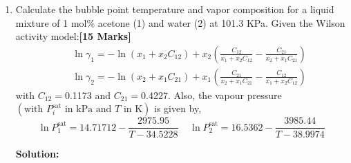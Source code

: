 \documentclass[12pts,a4paper,amsmath,amssymb,floatfix]{article}%
\newcommand{\frc}{\displaystyle\frac}
\begin{document}
\begin{enumerate}[label=\bfseries Problem \arabic*]
\item\label{Example:2} Calculate the bubble point temperature and vapor composition for a liquid mixture of 1 mol$\%$ acetone (1) and water (2) at 101.3 KPa. Given the Wilson activity model:\hfill{\bf [15 Marks]}
   \begin{eqnarray}
       &&\ln\gamma_{1} = -\ln\left(x_{1}+x_{2}C_{12}\right) + x_{2}\left(\frc{C_{12}}{x_{1}+x_{2}C_{12}}-\frc{C_{21}}{x_{2}+x_{1}C_{21}}\right) \nonumber \\
       &&\ln\gamma_{2} = -\ln\left(x_{2}+x_{1}C_{21}\right) + x_{1}\left(\frc{C_{21}}{x_{2}+x_{1}C_{21}}-\frc{C_{12}}{x_{1}+x_{2}C_{12}}\right) \nonumber
   \end{eqnarray}
   with $C_{12}=$0.1173 and $C_{21}=$0.4227. Also, the vapour pressure $\left(\text{with } P_{i}^{\text{sat}}\text{ in kPa and } T\text{ in K}\right)$ is given by,
\begin{displaymath}
   \ln P_{1}^{\text{sat}} = 14.71712 - \frc{2975.95}{T-34.5228} \;\;\;\; \ln P_{2}^{\text{sat}} = 16.5362 - \frc{3985.44}{T-38.9974}
\end{displaymath}

\bigskip

{\large{\bf Solution:}}{\it

}
\end{enumerate}
\end{document}
